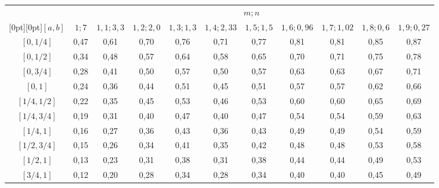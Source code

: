 \begin{table*}[b]
\begin{center}
\tabcolsep=5pt
\begin{tabular}{|c|c|c|c|c|c|c|c|c|c|c|}
 \hline
 &\multicolumn{10}{c|}{$m;n$}\\
 \cline{2-11}
 \multicolumn{1}{|c|}{\raisebox{6pt}[0pt][0pt]{$[a,b]$ }}&
  ${1; 7}$ & ${1,1; 3,3}$ & ${1,2; 2,0}$ &
  ${1,3; 1,3}$ & ${1,4; 2,33}$ & ${1,5; 1,5}$ &
  ${1,6; 0,96}$ & ${1,7; 1,02}$ & ${1,8; 0,6}$ & ${1,9; 0,27}$\\
 \hline
$[0,1/4]$&0,47&0,61&0,70&0,76&0,71&0,77&0,81&0,81&0,85&0,87\\
$[0,1/2]$&0,34&0,48&0,57&0,64&0,58&0,65&0,70&0,71&0,75&0,78\\
$[0,3/4]$&0,28&0,41&0,50&0,57&0,50&0,57&0,63&0,63&0,67&0,71\\
$[0,1]$&0,24&0,36&0,44&0,51&0,45&0,51&0,57&0,57&0,62&0,66\\
$[1/4,1/2]$&0,22&0,35&0,45&0,53&0,46&0,53&0,60&0,60&0,65&0,69\\
$[1/4,3/4]$&0,19&0,31&0,40&0,47&0,40&0,47&0,54&0,54&0,59&0,63\\
$[1/4,1]$&0,16&0,27&0,36&0,43&0,36&0,43&0,49&0,49&0,54&0,59\\
$[1/2,3/4]$&0,15&0,26&0,34&0,41&0,35&0,42&0,48&0,48&0,53&0,58\\
$[1/2,1]$&0,13&0,23&0,31&0,38&0,31&0,38&0,44&0,44&0,49&0,53\\
$[3/4,1]$&0,12&0,20&0,28&0,34&0,28&0,34&0,40&0,40&0,45&0,49\\
 \hline
 \end{tabular}
 \end{center}
 \end{table*}


